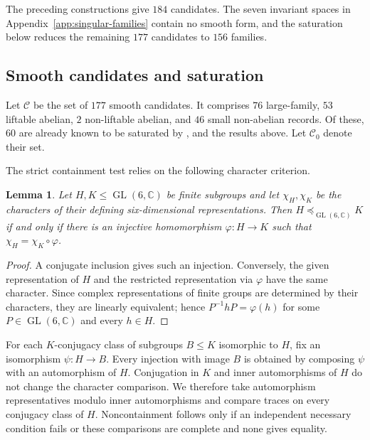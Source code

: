 \documentclass[12pt]{amsart}
\numberwithin{equation}{section}
\theoremstyle{plain}
\newtheorem{lem}[thm]{Lemma}
\theoremstyle{definition}
\theoremstyle{remark}
\newcommand{\CC}{\mathbb C}
\DeclareMathOperator{\GL}{GL}
\begin{document}
The preceding constructions give $184$ candidates.  The seven invariant
spaces in Appendix~\ref{app:singular-families} contain no smooth form, and
the saturation below reduces the remaining $177$
candidates to $156$ families.

\subsection{Smooth candidates and saturation}
\label{subsec:saturation-verification}

Let $\mathscr C$ be the set of $177$ smooth candidates.  It comprises $76$
large-family, $53$ liftable abelian, $2$ non-liftable abelian, and $46$
small non-abelian records. Of these, $60$ are already known to be saturated
by \cite{he2025cubicfourfoldsorder7automorphism}, \cite{FWZ26} and the results above.
Let $\mathscr C_0$ denote their set.

The strict containment test relies on the following character criterion.

\begin{lem}\label{lem:strict-character-criterion}
Let $H,K\leq\GL(6,\CC)$ be finite subgroups and let $\chi_H,\chi_K$ be the
characters of their defining six-dimensional representations.  Then
$H\preceq_{\GL(6,\CC)}K$ if and only if there is an injective homomorphism
$\varphi:H\to K$ such that $\chi_H=\chi_K\circ\varphi$.
\end{lem}

\begin{proof}
A conjugate inclusion gives such an injection.  Conversely, the given
representation of $H$ and the restricted representation via $\varphi$ have
the same character.  Since complex representations of finite groups are
determined by their characters, they are linearly equivalent; hence
$P^{-1}hP=\varphi(h)$ for some $P\in\GL(6,\CC)$ and every $h\in H$.
\end{proof}

For each $K$-conjugacy class of subgroups $B\leq K$ isomorphic to $H$,
fix an isomorphism $\psi:H\to B$.  Every injection with image $B$ is
obtained by composing $\psi$ with an automorphism of $H$.  Conjugation in
$K$ and inner automorphisms of $H$ do not change the character comparison.
We therefore take automorphism representatives modulo inner automorphisms
and compare traces on every conjugacy class of $H$.  Noncontainment follows
only if an independent necessary condition fails or these comparisons are
complete and none gives equality.
\end{document}
